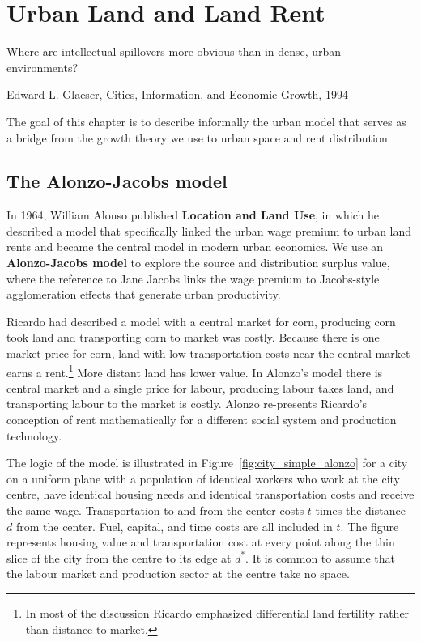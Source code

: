 \chapter{Urban Land and Land Rent} \label{chapter-space}
\epigraph{Where are intellectual spillovers more obvious than in dense, urban environments?}{Edward L. Glaeser, Cities, Information, and Economic Growth, 1994}


The goal of this chapter is to describe informally the urban model that serves as a bridge from the growth theory we use to urban space and rent distribution.

\section{The Alonzo-Jacobs model}
In 1964, William Alonso published \textbf{Location and Land Use}, in which he described a model that specifically linked the urban wage premium to urban land rents and  became the central model in modern urban economics. 
We use an \textbf{Alonzo-Jacobs model} to explore the source and distribution surplus value, where the reference to Jane Jacobs links the wage premium to Jacobs-style  agglomeration effects that generate urban productivity.%

Ricardo had described a model with a central market for corn, producing corn took land and transporting corn to market was costly. Because there is one market price for corn, land with low transportation costs near the central market earns a rent.\footnote{In most of the discussion Ricardo emphasized  differential land fertility rather than distance to market.} More distant land has lower value. In Alonzo's model there is central market and a single price for labour, producing labour takes land, and transporting labour to the market is costly. Alonzo re-presents Ricardo's conception of rent  mathematically for a different social system and production technology.  

The logic of the model is illustrated in Figure~\ref{fig:city_simple_alonzo} for a city on a uniform plane with a population of identical workers who work at the city centre, have identical housing needs and identical transportation costs and receive the same wage. Transportation to and from the center costs $t$ times the distance $d$ from the center. Fuel, capital, and time costs are  all included in $t$. The figure represents housing value and transportation cost at every point along the thin slice of the city from the centre to its edge at $d^*$.  It is common to assume that the labour market and production sector at the centre take no space.%

